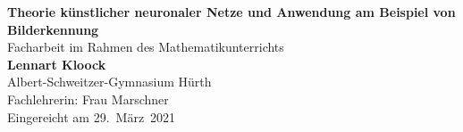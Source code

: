 \documentclass[11pt]{article}
\begin{document}
    \begin{titlepage}
        \begin{center}
            \vspace*{1cm}
            \Huge
            \textbf{Theorie künstlicher neuronaler Netze und Anwendung am Beispiel von Bilderkennung}\\

            \vspace{0.5cm}
            \LARGE
            Facharbeit im Rahmen des Mathematikunterrichts\\

            \vspace{1.5cm}
            \textbf{Lennart Kloock}\\

            \vfill
            \large
            Albert-Schweitzer-Gymnasium Hürth\\
            Fachlehrerin: Frau Marschner\\

            \vspace{0.5cm}
            Eingereicht am 29.~März~2021
        \end{center}
    \end{titlepage}

    \tableofcontents
    \pagebreak

    \setcounter{page}{3}

    

    
    \pagebreak

    
    \pagebreak

    
    \pagebreak

    
    \pagebreak

    

    
\end{document}
